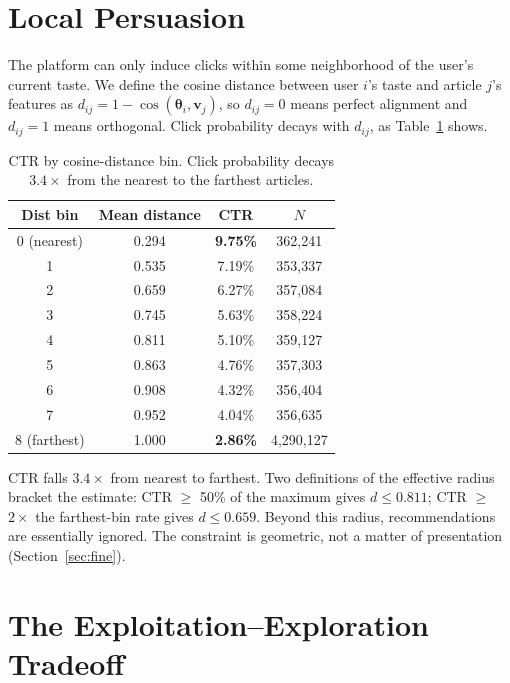 \documentclass[11pt]{article}
\begin{document}
\section{Local Persuasion}
\label{sec:persuasion}

The platform can only induce clicks within some neighborhood of the user's current taste. We define the cosine distance between user $i$'s taste and article $j$'s features as $d_{ij} = 1 - \cos(\boldsymbol{\theta}_i, \mathbf{v}_j)$, so $d_{ij} = 0$ means perfect alignment and $d_{ij} = 1$ means orthogonal. Click probability decays with $d_{ij}$, as Table~\ref{tab:persuasion_radius} shows.

\begin{table}[ht]
\centering
\caption{CTR by cosine-distance bin. Click probability decays $3.4\times$ from the nearest to the farthest articles.}
\label{tab:persuasion_radius}
\begin{tabular}{cccc}
\toprule
Dist bin & Mean distance & CTR & $N$ \\
\midrule
0 (nearest) & 0.294 & \textbf{9.75\%} & 362,241 \\
1 & 0.535 & 7.19\% & 353,337 \\
2 & 0.659 & 6.27\% & 357,084 \\
3 & 0.745 & 5.63\% & 358,224 \\
4 & 0.811 & 5.10\% & 359,127 \\
5 & 0.863 & 4.76\% & 357,303 \\
6 & 0.908 & 4.32\% & 356,404 \\
7 & 0.952 & 4.04\% & 356,635 \\
8 (farthest) & 1.000 & \textbf{2.86\%} & 4,290,127 \\
\bottomrule
\end{tabular}
\end{table}
\FloatBarrier

CTR falls $3.4\times$ from nearest to farthest. Two definitions of the effective radius bracket the estimate: CTR $\geq$ 50\% of the maximum gives $d \leq 0.811$; CTR $\geq$ $2\times$ the farthest-bin rate gives $d \leq 0.659$. Beyond this radius, recommendations are essentially ignored. The constraint is geometric, not a matter of presentation (Section~\ref{sec:fine}).


\section{The Exploitation--Exploration Tradeoff}
\label{sec:tradeoff}
\end{document}
